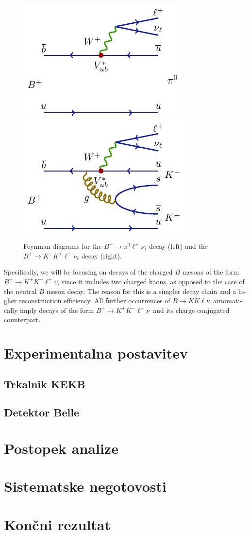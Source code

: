 \documentclass[headings=standardclasses,headings=big,oneside,a4paper,openany,12pt]{scrbook}
\newcommand {\decaya}{$B \to K K \ell \nu$}
\newcommand {\decayb}{$B^+ \to K^+ K^- \ell^+ \nu$}
\begin{document}
\begin{otherlanguage}{slovene}
\begin{figure}[H]
\centering
\includegraphics{texfig/B2pilnu}
\hspace{1cm}
\includegraphics{texfig/B2KKlnu}
\caption{Feynman diagrams for the $B^+ \to \pi^0 \ell^+ \nu_\ell$ decay (left) and the $B^+ \to K^- K^+ \ell^+ \nu_\ell$ decay (right).}
\label{feynman}
\end{figure}

Specifically, we will be focusing on decays of the charged $B$ mesons of the form \decayb, since it includes two charged kaons, as opposed to the case of the neutral $B$ meson decay. The reason for this is a simpler decay chain and a higher reconstruction efficiency. All further occurrences of \decaya~automatically imply decays of the form \decayb~and its charge conjugated counterpart.

\section{Experimentalna postavitev}
\subsection{Trkalnik KEKB}
\subsection{Detektor Belle}
\section{Postopek analize}
\section{Sistematske negotovosti}
\section{Kon\v cni rezultat}
\end{otherlanguage}
\end{document}
